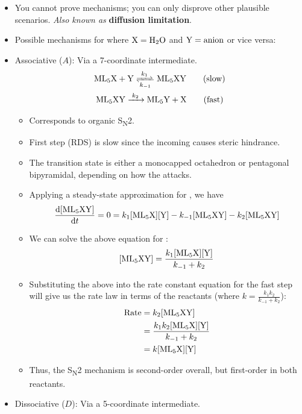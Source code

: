 \documentclass[../notes.tex]{subfiles}
\begin{document}
\begin{itemize}
    \item You cannot prove mechanisms; you can only disprove other plausible scenarios. \emph{Also known as} \textbf{diffusion limitation}.
    \item Possible mechanisms for  where $\ce{X}=\ce{H2O}$ and $\ce{Y}=\text{anion}$ or vice versa:
    \item Associative ($A$): Via a 7-coordinate intermediate.
    \begin{gather*}
        \ce{ML5X + Y <=>[$k_1$][$k_{-1}$] ML5XY}\tag{slow}\\
        \ce{ML5XY ->[$k_2$] ML5Y + X}\tag{fast}
    \end{gather*}
    \begin{itemize}
        \item Corresponds to organic S\textsubscript{N}2.
        \item First step (RDS) is slow since the incoming  causes steric hindrance.
        \item The transition state is either a monocapped octahedron or pentagonal bipyramidal, depending on how the  attacks.
        \item Applying a steady-state approximation for \ce{[ML5XY]}, we have
        \begin{equation*}
            \dv{\ce{[ML5XY]}}{t} = 0 = k_1\ce{[ML5X][Y]}-k_{-1}\ce{[ML5XY]}-k_2\ce{[ML5XY]}
        \end{equation*}
        \item We can solve the above equation for \ce{[ML5XY]}:
        \begin{equation*}
            \ce{[ML5XY]} = \frac{k_1\ce{[ML5X][Y]}}{k_{-1}+k_2}
        \end{equation*}
        \item Substituting the above into the rate constant equation for the fast step will give us the rate law in terms of the reactants (where $k=\frac{k_1k_2}{k_{-1}+k_2}$):
        \begin{align*}
            \text{Rate} &= k_2\ce{[ML5XY]}\\
            &= \frac{k_1k_2\ce{[ML5X][Y]}}{k_{-1}+k_2}\\
            &= k\ce{[ML5X][Y]}
        \end{align*}
        \item Thus, the S\textsubscript{N}2 mechanism is second-order overall, but first-order in both reactants.
    \end{itemize}
    \item Dissociative ($D$): Via a 5-coordinate intermediate.

\end{itemize}
\end{document}
